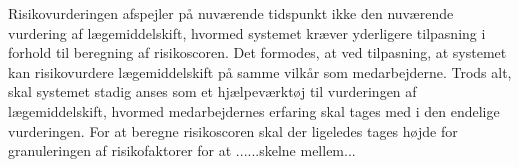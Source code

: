 Risikovurderingen afspejler på nuværende tidspunkt ikke den nuværende vurdering af lægemiddelskift, hvormed systemet kræver yderligere tilpasning i forhold til beregning af risikoscoren. Det formodes, at ved tilpasning, at systemet kan risikovurdere lægemiddelskift på samme vilkår som medarbejderne. Trods alt, skal systemet stadig anses som et hjælpeværktøj til vurderingen af lægemiddelskift, hvormed medarbejdernes erfaring skal tages med i den endelige vurderingen. For at beregne risikoscoren skal der ligeledes tages højde for granuleringen af risikofaktorer for at ......skelne mellem...

